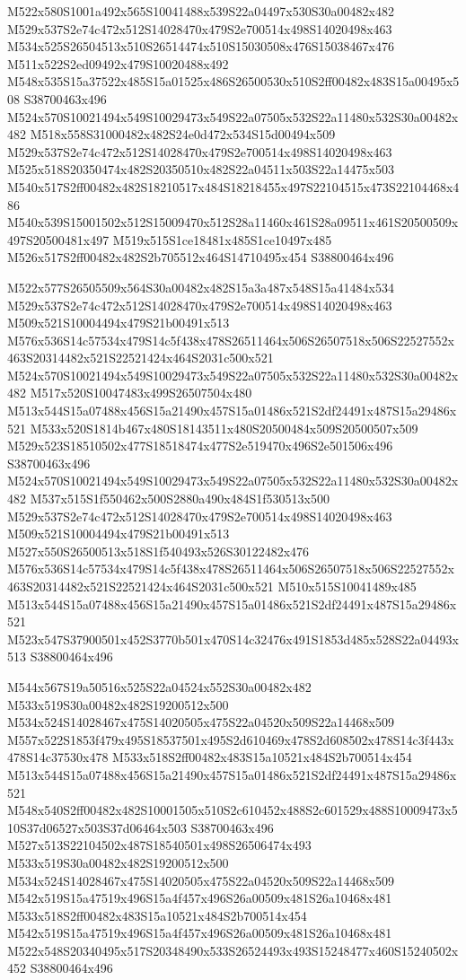 \documentclass{article}
\begin{document}
\begin{multicols}{2}
M522x580S1001a492x565S10041488x539S22a04497x530S30a00482x482 M529x537S2e74c472x512S14028470x479S2e700514x498S14020498x463 M534x525S26504513x510S26514474x510S15030508x476S15038467x476 M511x522S2ed09492x479S10020488x492 M548x535S15a37522x485S15a01525x486S26500530x510S2ff00482x483S15a00495x508 S38700463x496 M524x570S10021494x549S10029473x549S22a07505x532S22a11480x532S30a00482x482 M518x558S31000482x482S24e0d472x534S15d00494x509 M529x537S2e74c472x512S14028470x479S2e700514x498S14020498x463 M525x518S20350474x482S20350510x482S22a04511x503S22a14475x503 M540x517S2ff00482x482S18210517x484S18218455x497S22104515x473S22104468x486 M540x539S15001502x512S15009470x512S28a11460x461S28a09511x461S20500509x497S20500481x497 M519x515S1ce18481x485S1ce10497x485 M526x517S2ff00482x482S2b705512x464S14710495x454 S38800464x496

M522x577S26505509x564S30a00482x482S15a3a487x548S15a41484x534 M529x537S2e74c472x512S14028470x479S2e700514x498S14020498x463 M509x521S10004494x479S21b00491x513 M576x536S14c57534x479S14c5f438x478S26511464x506S26507518x506S22527552x463S20314482x521S22521424x464S2031c500x521 M524x570S10021494x549S10029473x549S22a07505x532S22a11480x532S30a00482x482 M517x520S10047483x499S26507504x480 M513x544S15a07488x456S15a21490x457S15a01486x521S2df24491x487S15a29486x521 M533x520S1814b467x480S18143511x480S20500484x509S20500507x509 M529x523S18510502x477S18518474x477S2e519470x496S2e501506x496 S38700463x496 M524x570S10021494x549S10029473x549S22a07505x532S22a11480x532S30a00482x482 M537x515S1f550462x500S2880a490x484S1f530513x500 M529x537S2e74c472x512S14028470x479S2e700514x498S14020498x463 M509x521S10004494x479S21b00491x513 M527x550S26500513x518S1f540493x526S30122482x476 M576x536S14c57534x479S14c5f438x478S26511464x506S26507518x506S22527552x463S20314482x521S22521424x464S2031c500x521 M510x515S10041489x485 M513x544S15a07488x456S15a21490x457S15a01486x521S2df24491x487S15a29486x521 M523x547S37900501x452S3770b501x470S14c32476x491S1853d485x528S22a04493x513 S38800464x496

M544x567S19a50516x525S22a04524x552S30a00482x482 M533x519S30a00482x482S19200512x500 M534x524S14028467x475S14020505x475S22a04520x509S22a14468x509 M557x522S1853f479x495S18537501x495S2d610469x478S2d608502x478S14c3f443x478S14c37530x478 M533x518S2ff00482x483S15a10521x484S2b700514x454 M513x544S15a07488x456S15a21490x457S15a01486x521S2df24491x487S15a29486x521 M548x540S2ff00482x482S10001505x510S2c610452x488S2c601529x488S10009473x510S37d06527x503S37d06464x503 S38700463x496 M527x513S22104502x487S18540501x498S26506474x493 M533x519S30a00482x482S19200512x500 M534x524S14028467x475S14020505x475S22a04520x509S22a14468x509 M542x519S15a47519x496S15a4f457x496S26a00509x481S26a10468x481 M533x518S2ff00482x483S15a10521x484S2b700514x454 M542x519S15a47519x496S15a4f457x496S26a00509x481S26a10468x481 M522x548S20340495x517S20348490x533S26524493x493S15248477x460S15240502x452 S38800464x496


\end{multicols}
\end{document}
